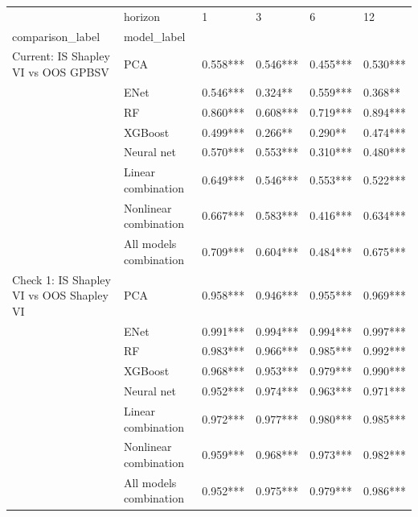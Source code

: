 \begin{tabular}{llllll}
\toprule
                                     & horizon &        1  &        3  &        6  &        12 \\
comparison\_label & model\_label &           &           &           &           \\
\midrule
Current: IS Shapley VI vs OOS GPBSV & PCA &  0.558*** &  0.546*** &  0.455*** &  0.530*** \\
                                     & ENet &  0.546*** &   0.324** &  0.559*** &   0.368** \\
                                     & RF &  0.860*** &  0.608*** &  0.719*** &  0.894*** \\
                                     & XGBoost &  0.499*** &   0.266** &   0.290** &  0.474*** \\
                                     & Neural net &  0.570*** &  0.553*** &  0.310*** &  0.480*** \\
                                     & Linear combination &  0.649*** &  0.546*** &  0.553*** &  0.522*** \\
                                     & Nonlinear combination &  0.667*** &  0.583*** &  0.416*** &  0.634*** \\
                                     & All models combination &  0.709*** &  0.604*** &  0.484*** &  0.675*** \\
Check 1: IS Shapley VI vs OOS Shapley VI & PCA &  0.958*** &  0.946*** &  0.955*** &  0.969*** \\
                                     & ENet &  0.991*** &  0.994*** &  0.994*** &  0.997*** \\
                                     & RF &  0.983*** &  0.966*** &  0.985*** &  0.992*** \\
                                     & XGBoost &  0.968*** &  0.953*** &  0.979*** &  0.990*** \\
                                     & Neural net &  0.952*** &  0.974*** &  0.963*** &  0.971*** \\
                                     & Linear combination &  0.972*** &  0.977*** &  0.980*** &  0.985*** \\
                                     & Nonlinear combination &  0.959*** &  0.968*** &  0.973*** &  0.982*** \\
                                     & All models combination &  0.952*** &  0.975*** &  0.979*** &  0.986*** \\

\end{tabular}
